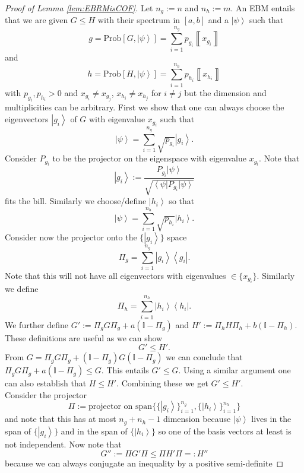 \documentclass{theoretics}
\begin{document}
\begin{proof}[Proof of Lemma \ref{lem:EBRMisCOF}]
Let $n_{g}:=n$ and $n_{h}:=m$. An EBM entails that we are given
$G\le H$ with their spectrum in $[a,b]$ and a $\left|\psi\right\rangle $
such that 
\[
g=\text{Prob}[G,\left|\psi\right\rangle ]=\sum_{i=1}^{n_{g}}p_{g_{i}}\left\llbracket x_{g_{i}}\right\rrbracket 
\]
 and 
\[
h=\text{Prob}[H,\left|\psi\right\rangle ]=\sum_{i=1}^{n_{h}}p_{h_{i}}\left\llbracket x_{h_{i}}\right\rrbracket 
\]
with $p_{g_{i}},p_{h_{i}}>0$ and $x_{g_{i}}\neq x_{g_{j}}$, $x_{h_{i}}\neq x_{h_{j}}$
for $i\neq j$ but the dimension and multiplicities can be arbitrary.
First we show that one can always choose the eigenvectors $\left|g_{i}\right\rangle $
of $G$ with eigenvalue $x_{g_{i}}$ such that 
\[
\left|\psi\right\rangle =\sum_{i=1}^{n_{g}}\sqrt{p_{g_{i}}}\left|g_{i}\right\rangle .
\]
Consider $P_{g_{i}}$ to be the projector on the eigenspace with eigenvalue
$x_{g_{i}}$. Note that 
\[
\left|g_{i}\right\rangle :=\frac{P_{g_{i}}\left|\psi\right\rangle }{\sqrt{\left\langle \psi\right|P_{g_{i}}\left|\psi\right\rangle }}
\]
fits the bill. Similarly we choose/define $\left|h_{i}\right\rangle $
so that 
\[
\left|\psi\right\rangle =\sum_{i=1}^{n_{h}}\sqrt{p_{h_{i}}}\left|h_{i}\right\rangle .
\]
Consider now the projector onto the $\{\left|g_{i}\right\rangle \}$
space 
\[
\Pi_{g}=\sum_{i=1}^{n_{g}}\left|g_{i}\right\rangle \left\langle g_{i}\right|.
\]
Note that this will not have all eigenvectors with eigenvalues $\in\{x_{g_{i}}\}$.
Similarly we define 
\[
\Pi_{h}=\sum_{i=1}^{n_{h}}\left|h_{i}\right\rangle \left\langle h_{i}\right|.
\]
We further define $G':=\Pi_{g}G\Pi_{g}+a(\mathbb{I}-\Pi_{g})$ and
$H':=\Pi_{h}H\Pi_{h}+b(\mathbb{I}-\Pi_{h})$. These definitions are
useful as we can show 
\[
G'\le H'.
\]
From $G=\Pi_{g}G\Pi_{g}+(\mathbb{I}-\Pi_{g})G(\mathbb{I}-\Pi_{g})$
we can conclude that $\Pi_{g}G\Pi_{g}+a(\mathbb{I}-\Pi_{g})\le G$.
This entails $G'\le G$. Using a similar argument one can also establish
that $H\le H'$. Combining these we get $G'\le H'$. \\
Consider the projector 
\[
\Pi:=\text{projector on span}\{\{\left|g_{i}\right\rangle \}_{i=1}^{n_{g}},\{\left|h_{i}\right\rangle \}_{i=1}^{n_{h}}\}
\]
and note that this has at most $n_{g}+n_{h}-1$ dimension because
$\left|\psi\right\rangle $ lives in the span of $\{\left|g_{i}\right\rangle \}$
and in the span of $\{\left|h_{i}\right\rangle \}$ so one of the
basis vectors at least is not independent. Now note that 
\[
G'':=\Pi G'\Pi\le\Pi H'\Pi=:H''
\]
because we can always conjugate an inequality by a positive semi-definite

\end{proof}
\end{document}
